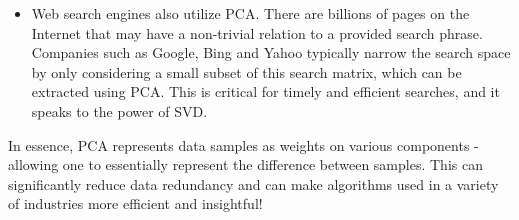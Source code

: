 \documentclass{article}
\begin{document}
\begin{itemize}
\item Web search engines also utilize PCA. There are billions of pages on the Internet that may have a non-trivial relation to a provided search phrase. Companies such as Google, Bing and Yahoo typically narrow the search space by only considering a small subset of this search matrix, which can be extracted using PCA\cite{search-clustering}. This is critical for timely and efficient searches, and it speaks to the power of SVD.
\end{itemize}

In essence, PCA represents data samples as weights on various components - allowing one to essentially represent the difference between samples. This can significantly reduce data redundancy and can make algorithms used in a variety of industries more efficient and insightful!

\small


\end{document}
